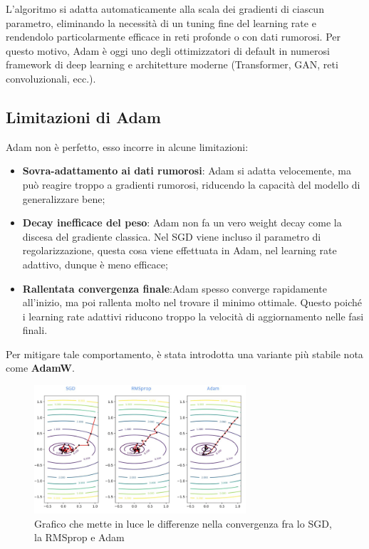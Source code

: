 L’algoritmo si adatta automaticamente alla scala dei gradienti di ciascun parametro, eliminando la necessità di un tuning fine del learning rate e rendendolo particolarmente efficace in reti profonde o con dati rumorosi. Per questo motivo, Adam è oggi uno degli ottimizzatori di default in numerosi framework di deep learning e architetture moderne (Transformer, GAN, reti convoluzionali, ecc.).

\subsection{Limitazioni di Adam}
Adam non è perfetto, esso incorre in alcune limitazioni:
\begin{itemize}
    \item\textbf{Sovra-adattamento ai dati rumorosi}: Adam si adatta velocemente, ma può reagire troppo a gradienti rumorosi, riducendo la capacità del modello di generalizzare bene;
    \item \textbf{Decay inefficace del peso}: Adam non fa un vero weight decay come la discesa del gradiente classica. Nel SGD viene incluso il parametro di regolarizzazione, questa cosa viene effettuata in Adam, nel learning rate adattivo, dunque è meno efficace;
    \item\textbf{Rallentata convergenza finale}:Adam spesso converge rapidamente all'inizio, ma poi rallenta molto nel trovare il minimo ottimale. Questo poiché i learning rate adattivi riducono troppo la velocità di aggiornamento nelle fasi finali.
\end{itemize}
Per mitigare tale comportamento, è stata introdotta una variante più stabile nota come \textbf{AdamW}.
\begin{figure}
    \centering
    \includegraphics[width=0.7\textwidth]{figure/sgrmspropadam.png}
    \caption{Grafico che mette in luce le differenze nella convergenza fra lo SGD, la RMSprop e Adam}
    \label{fig:diffAdamSGDRMSprop}
\end{figure}


